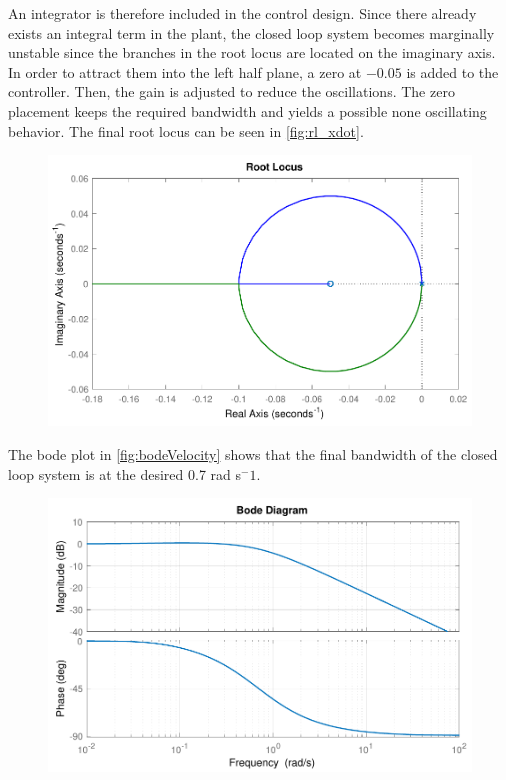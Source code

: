An integrator is therefore included in the control design. Since there already exists an integral term in the plant, the closed loop system becomes marginally unstable since the branches in the root locus are located on the imaginary axis. In order to attract them into the left half plane, a zero at $-0.05$ is added to the controller. Then, the gain is adjusted to reduce the oscillations. The zero placement keeps the required bandwidth and yields a possible none oscillating behavior. The final root locus can be seen in \autoref{fig:rl_xdot}.
%
\begin{figure}[H]
	\includegraphics[scale=.7]{figures/rl_xdot}
	\centering			
	\label{fig:rl_xdot}
\end{figure}
%
The bode plot in \autoref{fig:bodeVelocity} shows that the final bandwidth of the closed loop system is at the desired 0.7 rad s$^-1$.
%
\begin{figure}[H]
	\includegraphics[scale=.8]{figures/bodeVelocity}
	\centering			
	\label{fig:bodeVelocity}
\end{figure}

